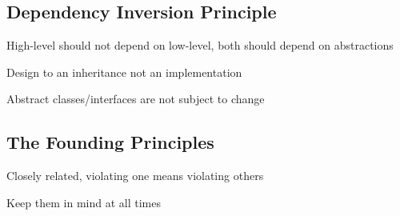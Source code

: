 \documentclass[12pt]{article}
\begin{document}
\subsection{Dependency Inversion Principle}

High-level should not depend on low-level, both should depend on abstractions

Design to an inheritance not an implementation

Abstract classes/interfaces are not subject to change

\subsection{The Founding Principles}

Closely related, violating one means violating others

Keep them in mind at all times
\end{document}
